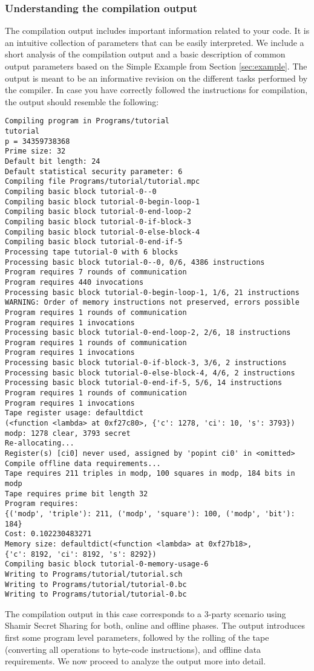 \subsubsection{Understanding the compilation output}

The compilation output includes important information related to your code. 
It is an intuitive collection of parameters that can be easily interpreted. 
We include a short analysis of the compilation output and a basic description of common output parameters based on the Simple Example from  Section \ref{sec:example}.
 The output is meant to be an informative revision on the different tasks performed by the compiler. In case you have correctly followed the instructions for compilation, the output should resemble the following: 

\begin{verbatim}
Compiling program in Programs/tutorial
tutorial
p = 34359738368
Prime size: 32
Default bit length: 24
Default statistical security parameter: 6
Compiling file Programs/tutorial/tutorial.mpc
Compiling basic block tutorial-0--0
Compiling basic block tutorial-0-begin-loop-1
Compiling basic block tutorial-0-end-loop-2
Compiling basic block tutorial-0-if-block-3
Compiling basic block tutorial-0-else-block-4
Compiling basic block tutorial-0-end-if-5
Processing tape tutorial-0 with 6 blocks
Processing basic block tutorial-0--0, 0/6, 4386 instructions
Program requires 7 rounds of communication
Program requires 440 invocations
Processing basic block tutorial-0-begin-loop-1, 1/6, 21 instructions
WARNING: Order of memory instructions not preserved, errors possible
Program requires 1 rounds of communication
Program requires 1 invocations
Processing basic block tutorial-0-end-loop-2, 2/6, 18 instructions
Program requires 1 rounds of communication
Program requires 1 invocations
Processing basic block tutorial-0-if-block-3, 3/6, 2 instructions
Processing basic block tutorial-0-else-block-4, 4/6, 2 instructions
Processing basic block tutorial-0-end-if-5, 5/6, 14 instructions
Program requires 1 rounds of communication
Program requires 1 invocations
Tape register usage: defaultdict
(<function <lambda> at 0xf27c80>, {'c': 1278, 'ci': 10, 's': 3793})
modp: 1278 clear, 3793 secret
Re-allocating...
Register(s) [ci0] never used, assigned by 'popint ci0' in <omitted>
Compile offline data requirements...
Tape requires 211 triples in modp, 100 squares in modp, 184 bits in modp
Tape requires prime bit length 32
Program requires: 
{('modp', 'triple'): 211, ('modp', 'square'): 100, ('modp', 'bit'): 184}
Cost: 0.102230483271
Memory size: defaultdict(<function <lambda> at 0xf27b18>, 
{'c': 8192, 'ci': 8192, 's': 8292})
Compiling basic block tutorial-0-memory-usage-6
Writing to Programs/tutorial/tutorial.sch
Writing to Programs/tutorial/tutorial-0.bc
Writing to Programs/tutorial/tutorial-0.bc
\end{verbatim}
The compilation output in this case corresponds  to a 3-party scenario using Shamir Secret Sharing for both, online and offline phases. 
The output introduces first some program level parameters, followed by the rolling of the tape (converting all operations to byte-code instructions), and offline data requirements. We now proceed to analyze the output more into detail.

